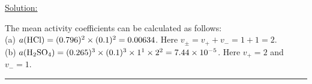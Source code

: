 \noindent
\underline{Solution:}

The mean activity coefficients can be calculated as follows:\\
(a) $a(\textnormal{HCl}) = (0.796)^2\times(0.1)^2 = 0.00634$. Here $v_\pm = v_+ + v_- = 1 + 1 = 2$.\\
(b) $a(\textnormal{H}_2\textnormal{SO}_4) = (0.265)^3\times(0.1)^3\times 1^1\times 2^2 = 7.44\times 10^{-5}$. Here $v_+ = 2$ and $v_- = 1$.

\hrule\vspace{0.5cm}
